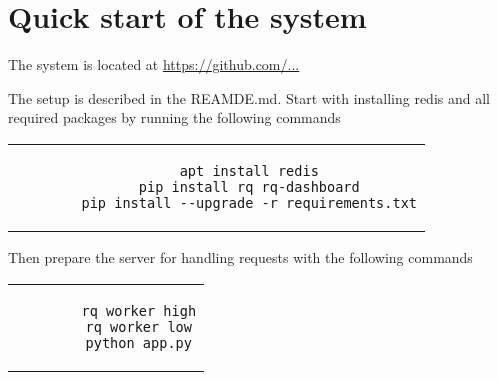 \appendix
\chapter{Quick start of the system}

The system is located at
\url{https://github.com/...}

The setup is described in the REAMDE.md.
Start with installing redis and all required packages by running the following commands

\begin{center}
	\begin{tabular}{c}
		\begin{lstlisting}
		apt install redis
		pip install rq rq-dashboard
		pip install --upgrade -r requirements.txt
		\end{lstlisting}
	\end{tabular}
\end{center}

Then prepare the server for handling requests with the following commands

\begin{center}
	\begin{tabular}{c}
		\begin{lstlisting}
		rq worker high
		rq worker low
		python app.py
		\end{lstlisting}
	\end{tabular}
\end{center}